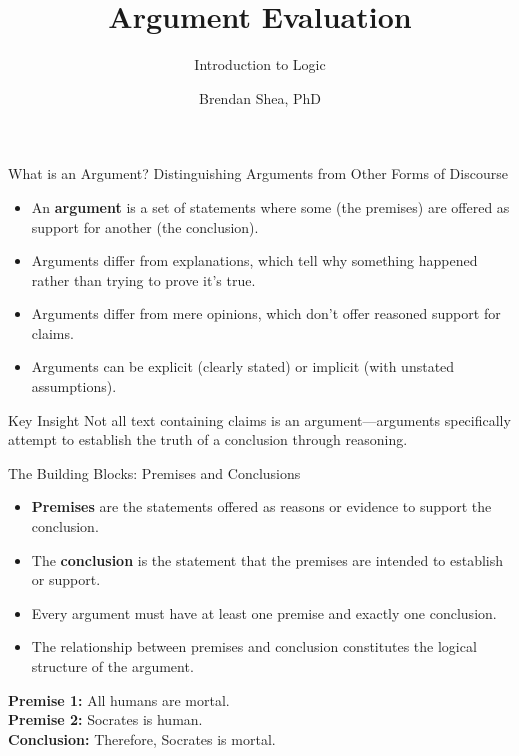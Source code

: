\documentclass{beamer}
\title{Argument Evaluation}
\subtitle{Introduction to Logic}
\author{Brendan Shea, PhD}
\begin{document}
\begin{frame}
    \titlepage
\end{frame}

\begin{frame}{What is an Argument? Distinguishing Arguments from Other Forms of Discourse}
    \begin{itemize}
        \item An \textbf{argument} is a set of statements where some (the premises) are offered as support for another (the conclusion).
        \item Arguments differ from explanations, which tell why something happened rather than trying to prove it's true.
        \item Arguments differ from mere opinions, which don't offer reasoned support for claims.
        \item Arguments can be explicit (clearly stated) or implicit (with unstated assumptions).
    \end{itemize}
    
    \begin{alertblock}{Key Insight}
        Not all text containing claims is an argument—arguments specifically attempt to establish the truth of a conclusion through reasoning.
    \end{alertblock}
\end{frame}

\begin{frame}{The Building Blocks: Premises and Conclusions}
    \begin{itemize}
        \item \textbf{Premises} are the statements offered as reasons or evidence to support the conclusion.
        \item The \textbf{conclusion} is the statement that the premises are intended to establish or support.
        \item Every argument must have at least one premise and exactly one conclusion.
        \item The relationship between premises and conclusion constitutes the logical structure of the argument.
    \end{itemize}
    
    \begin{example}
        \textbf{Premise 1:} All humans are mortal.\\
        \textbf{Premise 2:} Socrates is human.\\
        \textbf{Conclusion:} Therefore, Socrates is mortal.
    \end{example}
\end{frame}
\end{document}

